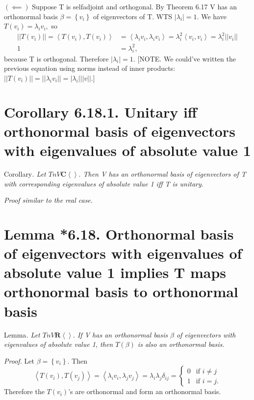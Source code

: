 \documentclass[12pt,english]{article}
\begin{document}
$(\impliedby)$ Suppose T is selfadjoint and orthogonal. By Theorem
6.17 V has an orthonormal basis $\beta=\left\{ v_{i}\right\} $ of
eigenvectors of T. WTS $\left|\lambda_{i}\right|=1.$ We have $T(v_{i})=\lambda_{i}v_{i},$
so
\begin{align*}
\left|\left|T(v_{i})\right|\right|=\left\langle T(v_{i}),T(v_{i})\right\rangle  & =\left\langle \lambda_{i}v_{i},\lambda_{i}v_{i}\right\rangle =\lambda_{i}^{2}\left\langle v_{i},v_{i}\right\rangle =\lambda_{i}^{2}\left|\left|v_{i}\right|\right|\\
1 & =\lambda_{i}^{2},
\end{align*}
because T is orthogonal. Therefore $\left|\lambda_{i}\right|=1.$
{[}NOTE. We could've written the previous equation using norms instead
of inner products: $\left|\left|T(v_{i})\right|\right|=\left|\left|\lambda_{i}v_{i}\right|\right|=\left|\lambda_{i}\right|\left|\left|v\right|\right|.${]}

\section{Corollary 6.18.1. Unitary iff orthonormal basis of eigenvectors with
eigenvalues of absolute value 1}

Corollary\emph{. Let $TnV\mathbf{C}\left\langle \right\rangle .$
Then V has an orthonormal basis of eigenvectors of T with corresponding
eigenvalues of absolute value 1 iff T is unitary.}

\emph{Proof similar to the real case.}

\section{Lemma {*}6.18. Orthonormal basis of eigenvectors with eigenvalues
of absolute value 1 implies T maps orthonormal basis to orthonormal
basis}

Lemma\emph{. Let $TnV\mathbf{R}\left\langle \right\rangle .$ If V
has an orthonormal basis $\beta$ of eigenvectors with eigenvalues
of absolute value 1, then $T(\beta)$ is also an orthonormal basis.}

\emph{Proof. }Let $\beta=\left\{ v_{i}\right\} .$ Then
\[
\left\langle T(v_{i}),T(v_{j})\right\rangle =\left\langle \lambda_{i}v_{i},\lambda_{j}v_{j}\right\rangle =\lambda_{i}\lambda_{j}\delta_{ij}=\begin{cases}
0 & \textrm{if }i\neq j\\
1 & \textrm{if }i=j.
\end{cases}
\]
Therefore the $T(v_{i})$'s are orthonormal and form an orthonormal
basis.
\end{document}
